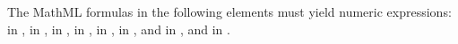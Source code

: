 The MathML formulas in the following elements must yield numeric
expressions:  in \KineticLaw,
 in \SpeciesReference,  in
\InitialAssignment,  in \AssignmentRule, 
in \RateRule,  in \AlgebraicRule, and  in
\Event, and  in \EventAssignment.


